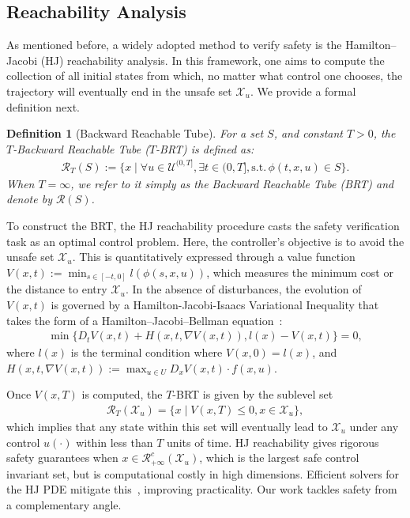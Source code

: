 \documentclass[letterpaper, 10 pt, conference]{ieeeconf}
\newtheorem{definition}{Definition}
\begin{document}
\subsection{Reachability Analysis}
\label{sec:reachability}
As mentioned before, a widely adopted method to verify safety is the Hamilton–Jacobi (HJ) reachability analysis. In this framework, one aims to compute the collection of all initial states from which, no matter what control one chooses, the trajectory will eventually end in the unsafe set $\mathcal{X}_u$. We provide a formal definition next.

\begin{definition}[Backward Reachable Tube]
For a set $S$, and constant $T>0$, the $T$-Backward Reachable Tube ($T$-BRT) is defined as:
\begin{align*}
\mathcal{R}_{T}(S) := \{ x \mid \forall u \in \mathcal{U}^{(0, T]}, \exists t \in (0,T], \mathrm{ s.t. } \,\phi(t,x,u) \in S \}.
\end{align*}
When $T=\infty$, we refer to it simply as the Backward Reachable Tube (BRT) and denote by $\mathcal{R}(S)$.
\end{definition}

To construct the BRT, the HJ reachability procedure casts the safety verification task as an optimal control problem. Here, the controller’s objective is to avoid the unsafe set $\mathcal{X}_{u}$. This is quantitatively expressed through a value function $V(x,t) := \min_{ s \in [-t, 0]} l(\phi(s, x, u))$, which measures the minimum cost or the distance to entry $\mathcal{X}_{u}$. In the absence of disturbances, the evolution of $V(x,t)$ is governed by a Hamilton-Jacobi-Isaacs Variational Inequality that takes the form of a Hamilton–Jacobi–Bellman equation~\cite{bcht2017cdc}:
\begin{align*}
\min \{ D_t V(x,t) + H(x,t,\nabla V(x,t)),
l(x) - V(x,t) \} = 0,
\end{align*}
where $l(x)$ is the terminal condition where $V(x, 0) = l(x)$, and $H(x, t, \nabla V(x, t)) := \max_{u \in U} D_{x} V(x, t) \cdot f(x, u)$.

Once $V(x,T)$ is computed, the $T$-BRT is given by the sublevel set
\begin{align*}
\mathcal{R}_T(\mathcal{X}_u)=\{ x \mid V(x,T) \le 0, x \in \mathcal{X}_{u} \},
\end{align*}
which implies that any state within this set will eventually lead to $\mathcal{X}_{u}$ under any control $u(\cdot)$ within less than $T$ units of time. HJ reachability gives rigorous safety guarantees when $x \in \mathcal{R}^{c}_{+\infty}(\mathcal{X}_u)$, which is the largest safe control invariant set, but is computational costly in high dimensions. Efficient solvers for the HJ PDE mitigate this~\cite{bcht2017cdc}, improving practicality. 
Our work tackles safety from a complementary angle.
\end{document}
